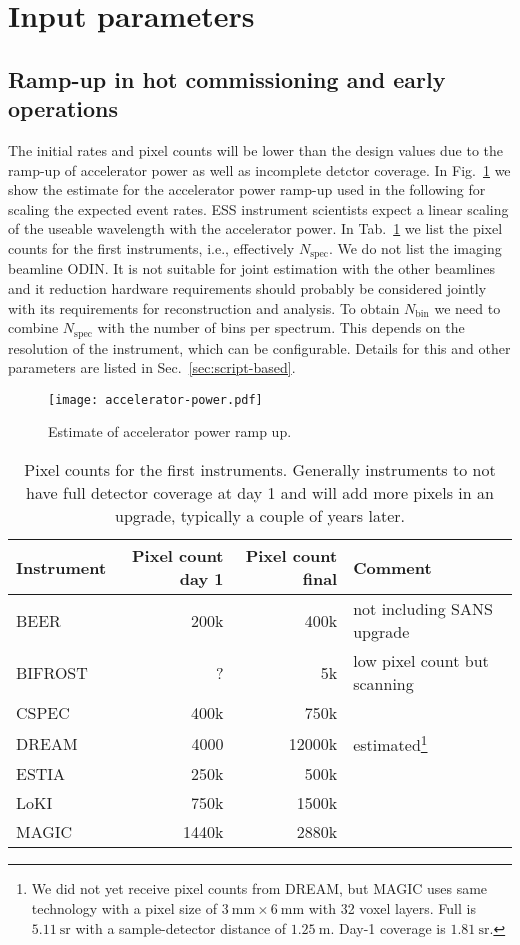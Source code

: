 \documentclass[a4paper,english,numbers=noenddot,bibliography=totoc,chapterprefix=on,DIV=12]{scrartcl}
\newcommand{\Nbin}{N_{\text{bin}}}
\newcommand{\Nspec}{N_{\text{spec}}}
\newcommand{\beer}{BEER\xspace}
\newcommand{\bifrost}{BIFROST\xspace}
\newcommand{\cspec}{CSPEC\xspace}
\newcommand{\dream}{DREAM\xspace}
\newcommand{\estia}{ESTIA\xspace}
\newcommand{\loki}{LoKI\xspace}
\newcommand{\magic}{MAGIC\xspace}
\newcommand{\odin}{ODIN\xspace}
\begin{document}
\section{Input parameters}

\subsection{Ramp-up in hot commissioning and early operations}

The initial rates and pixel counts will be lower than the design values due to the ramp-up of accelerator power as well as incomplete detctor coverage.
In Fig.~\ref{fig:accelerator-power} we show the estimate for the accelerator power ramp-up used in the following for scaling the expected event rates.
ESS instrument scientists expect a linear scaling of the useable wavelength with the accelerator power.
In Tab.~\ref{tab:pixel-counts} we list the pixel counts for the first instruments, i.e., effectively $\Nspec$.
We do not list the imaging beamline \odin.
It is not suitable for joint estimation with the other beamlines and it reduction hardware requirements should probably be considered jointly with its requirements for reconstruction and analysis.
To obtain $\Nbin$ we need to combine $\Nspec$ with the number of bins per spectrum.
This depends on the resolution of the instrument, which can be configurable.
Details for this and other parameters are listed in Sec.~\ref{sec:script-based}.

\begin{figure}
  \centering
\texttt{[image: accelerator-power.pdf]}
\caption{\label{fig:accelerator-power}Estimate of accelerator power ramp up.}
\end{figure}

\begin{table}
  \centering
  \begin{tabular}{lrrl}
    Instrument & Pixel count day 1 & Pixel count final & Comment\\
    \hline
    \beer & 200k & 400k & not including SANS upgrade\\
    \bifrost & ? & 5k & low pixel count but scanning\\
    \cspec & 400k & 750k \\
    \dream & 4000 & 12000k & estimated\footnote{We did not yet receive pixel counts from DREAM, but MAGIC uses same technology with a pixel size of $3~\mathrm{mm} \times 6~\mathrm{mm}$ with 32 voxel layers. Full is $5.11~\mathrm{sr}$ with a sample-detector distance of $1.25~\mathrm{m}$. Day-1 coverage is $1.81~\mathrm{sr}$.}\\
    \estia & 250k & 500k \\
    \loki & 750k & 1500k \\
    \magic & 1440k & 2880k \\
  \end{tabular}
  \caption{\label{tab:pixel-counts}Pixel counts for the first instruments. Generally instruments to not have full detector coverage at day 1 and will add more pixels in an upgrade, typically a couple of years later.}
\end{table}
\end{document}
